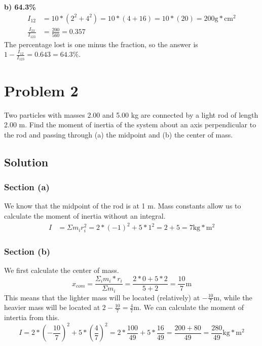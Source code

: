 \documentclass[12pt]{article}
\begin{document}
\textbf{b) 64.3\%}
\begin{align*}
    I_{12}  &=  10 * (2^2 + 4^2)
        =   10 * (4 + 16)
        =   10 * (20)
        =   200 \unit{\gram * \centi\meter^2}\\
    \frac{I_{23}}{I_{123}}  &=  \frac{200}{560}
        =   0.357
\end{align*}
The percentage lost is one minus the fraction, so the answer is $1 - \frac{I_{12}}{I_{123}} = 0.643 = \boxed{64.3\%}$.


\pagebreak
\section*{Problem 2}
Two particles with masses 2.00 and 5.00 kg are connected by a light rod of length 2.00 m.
Find the moment of inertia of the system about an axis perpendicular to the rod and passing
through (a) the midpoint and (b) the center of mass.

\subsection*{Solution}
\subsubsection*{Section (a)}
We know that the midpoint of the rod is at 1 m. Mass constants allow us to calculate the moment of inertia without an integral.
\begin{align*}
    I   &=  \Sigma m_i r_i^2
        =   2 * (-1)^2 + 5 * 1^2
        =   2 + 5
        =   \boxed{7 \unit{\kilo\gram*\meter^2}}
\end{align*}

\subsubsection*{Section (b)}
We first calculate the center of mass.
\begin{equation*}
    x_{com} =   \frac{\Sigma_i m_i*r_i}{\Sigma m_i}
        =   \frac{2 * 0 + 5 * 2}{5 + 2}
        =   \frac{10}{7} \unit{\meter}
\end{equation*}
This means that the lighter mass will be located (relatively) at $-\frac{10}{7}$m, while the heavier mass will be located at $2 - \frac{10}{7} = \frac{4}{7}$m. We can calculate the moment of intertia from this.
\begin{equation*}
    I   =   2 * \left(-\frac{10}{7}\right)^2 + 5 * \left(\frac{4}{7}\right)^2
        =   2 * \frac{100}{49} + 5 * \frac{16}{49}
        =   \frac{200 + 80}{49}
        =   \boxed{\frac{280}{49} \unit{\kilo\gram*\meter^2}}
\end{equation*}
\end{document}

